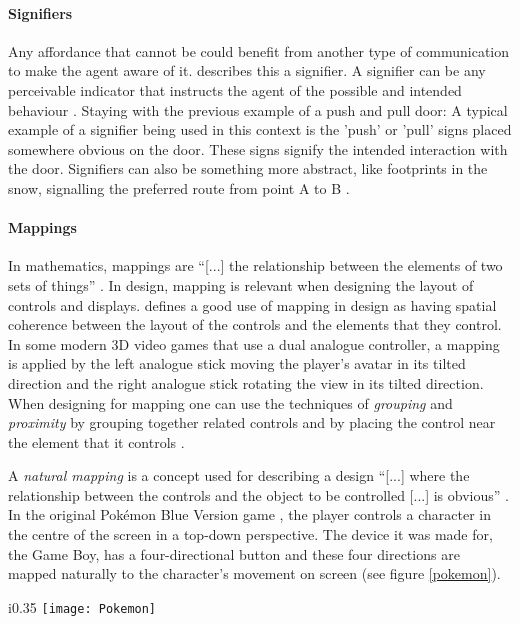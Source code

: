\paragraph{Signifiers} Any affordance that cannot be could benefit from another type of communication to make the agent aware of it.  describes this a signifier. A signifier can be any perceivable indicator that instructs the agent of the possible and intended behaviour \cite{norman}. Staying with the previous example of a push and pull door: A typical example of a signifier being used in this context is the 'push' or 'pull' signs placed somewhere obvious on the door. These signs signify the intended interaction with the door. Signifiers can also be something more abstract, like footprints in the snow, signalling the preferred route from point A to B \cite{norman}.

\paragraph{Mappings} In mathematics, mappings are ``[...] the relationship between the elements of two sets of things'' \cite[p. 20]{norman}. In design, mapping is relevant when designing the layout of controls and displays.  defines a good use of mapping in design as having spatial coherence between the layout of the controls and the elements that they control. In some modern 3D video games that use a dual analogue controller, a mapping is applied by the left analogue stick moving the player's avatar in its tilted direction and the right analogue stick rotating the view in its tilted direction. When designing for mapping one can use the techniques of \textit{grouping} and \textit{proximity} by grouping together related controls and by placing the control near the element that it controls \cite{norman}.

A \textit{natural mapping} \cite{norman} is a concept used for describing a design ``[...] where the relationship between the controls and the object to be controlled [...] is obvious'' \cite[p. 115]{norman}. In the original Pokémon Blue Version game \cite{pokemon}, the player controls a character in the centre of the screen in a top-down perspective. The device it was made for, the Game Boy, has a four-directional button and these four directions are mapped naturally to the character's movement on screen (see figure \ref{pokemon}).

\begin{wrapfigure}{i}{0.35\textwidth}
  \texttt{[image: Pokemon]}
  \caption{Pokémon Blue Version playing on a Game Boy}
  \label{pokemon}
\end{wrapfigure}

